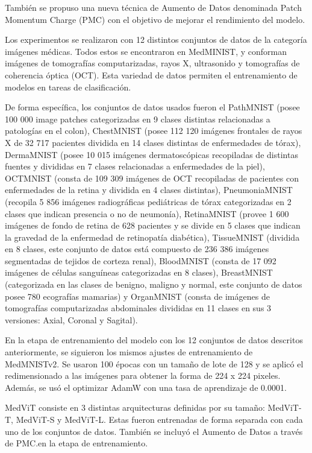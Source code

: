 También se propuso una nueva técnica de Aumento de Datos denominada Patch Momentum Charge (PMC) con el objetivo de mejorar el rendimiento del modelo.

Los experimentos se realizaron con 12 distintos conjuntos de datos de la categoría imágenes médicas. Todos estos se encontraron en MedMINIST, y conforman imágenes de tomografías computarizadas, rayos X, ultrasonido y tomografías de coherencia óptica (OCT). Esta variedad de datos permiten el entrenamiento de modelos en tareas de clasificación.

De forma específica, los conjuntos de datos usados fueron el PathMNIST (posee 100 000 image patches categorizadas en 9 clases distintas relacionadas a patologías en el colon), ChestMNIST (posee 112 120 imágenes frontales de rayos X de 32 717 pacientes dividida en 14 clases distintas de enfermedades de tórax), DermaMNIST (posee 10 015 imágenes dermatoscópicas recopiladas de distintas fuentes y divididas en 7 clases relacionadas a enfermedades de la piel), OCTMNIST (consta de 109 309 imágenes de OCT recopiladas de pacientes con enfermedades de la retina y dividida en 4 clases distintas), PneumoniaMNIST (recopila 5 856 imágenes radiográficas pediátricas de tórax categorizadas en 2 clases que indican presencia o no de neumonía), RetinaMNIST (provee 1 600 imágenes de fondo de retina de 628 pacientes y se divide en 5 clases que indican la gravedad de la enfermedad de retinopatía diabética), TissueMNIST (dividida en 8 clases, este conjunto de datos está compuesto de 236 386 imágenes segmentadas de tejidos de corteza renal), BloodMNIST (consta de 17 092 imágenes de células sanguíneas categorizadas en 8 clases), BreastMNIST (categorizada en las clases de benigno, maligno y normal, este conjunto de datos posee 780 ecografías mamarias) y OrganMNIST (consta de imágenes de tomografías computarizadas abdominales divididas en 11 clases en sus 3 versiones: Axial, Coronal y Sagital).

En la etapa de entrenamiento del modelo con los 12 conjuntos de datos descritos anteriormente, se siguieron los mismos ajustes de entrenamiento de MedMNISTv2. Se usaron 100 épocas con un tamaño de lote de 128 y se aplicó el redimensionado a las imágenes para obtener la forma de 224 x 224 pixeles. Además, se usó el optimizar AdamW con una tasa de aprendizaje de 0.0001.

MedViT consiste en 3 distintas arquitecturas definidas por su tamaño: MedViT-T, MedViT-S y MedViT-L. Estas fueron entrenadas de forma separada con cada uno de los conjuntos de datos. También se incluyó el Aumento de Datos a través de PMC.en la etapa de entrenamiento.

